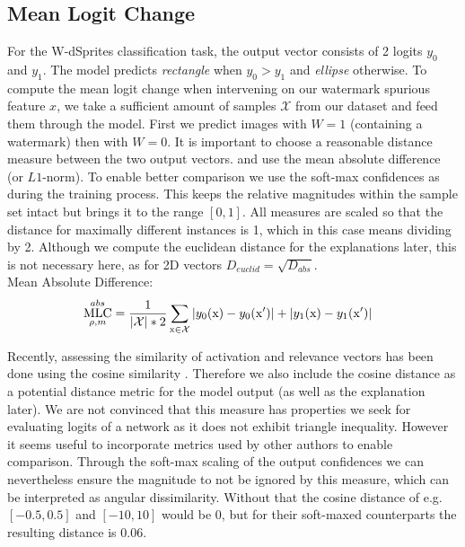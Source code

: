 \subsection{Mean Logit Change}
For the W-dSprites classification task, the output vector consists of 2 logits $y_0$ and $y_1$. The model predicts \textit{rectangle} when $y_0 > y_1$ and \textit{ellipse} otherwise. To compute the mean logit change when intervening on our watermark spurious feature $x$, we take a sufficient amount of samples $\mathcal{X}$ from our dataset and feed them through the model. First we predict images with $W=1$ (containing a watermark) then with $W=0$. It is important to choose a reasonable distance measure between the two output vectors. \cite{Sixt2022a} and \cite{Goyal2019} use the mean absolute difference (or $L1$-norm). To enable better comparison we use the soft-max confidences as during the training process. This keeps the relative magnitudes within the sample set intact but brings it to the range $[0,1]$. All measures are scaled so that the distance for maximally different instances is 1, which in this case means dividing by 2. Although we compute the euclidean distance for the explanations later, this is not necessary here, as for 2D vectors $D_{euclid} = \sqrt{D_{abs}}$.\\

Mean Absolute Difference:
\begin{align}\displaystyle 
& \operatorname*{MLC}_{\rho, m}^{abs} = \frac{1}{|\mathcal{X}| * 2} \sum_{\mathrm{x} \in \mathcal{X}} 
|y_0(\mathrm{x}) -y_0(\mathrm{x}')| + |y_1(\mathrm{x}) -y_1(\mathrm{x}')| 
\end{align}

Recently, assessing the similarity of activation and relevance vectors has been done using the cosine similarity \cite{Sixt2020, Dreyer2023a, Achtibat2022}. Therefore we also include the cosine distance as a potential distance metric for the model output (as well as the explanation later). We are not convinced that this measure has properties we seek for evaluating logits of a network as it does not exhibit triangle inequality. However it seems useful to incorporate metrics used by other authors to enable comparison. Through the soft-max scaling of the output confidences we can nevertheless ensure the magnitude to not be ignored by this measure, which can be interpreted as angular dissimilarity. Without that the cosine distance of e.g. $[-0.5,0.5]$ and $[-10,10]$ would be 0, but for their soft-maxed counterparts the resulting distance is $0.06$. \\


